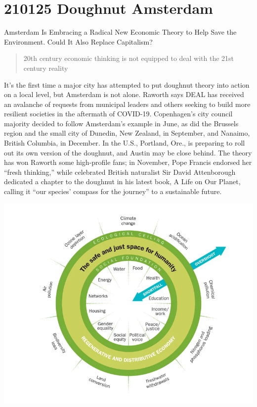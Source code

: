 \documentclass[
]{book}
\begin{document}
\hypertarget{doughnut-amsterdam}{%
\section{210125 Doughnut Amsterdam}\label{doughnut-amsterdam}}

Amsterdam Is Embracing a Radical New Economic Theory to Help Save the Environment.
Could It Also Replace Capitalism?

\begin{quote}
20th century economic thinking is not equipped to deal with the 21st century reality
\end{quote}

It's the first time a major city has attempted to put doughnut theory into action on a local level, but Amsterdam is not alone. Raworth says DEAL has received an avalanche of requests from municipal leaders and others seeking to build more resilient societies in the aftermath of COVID-19. Copenhagen's city council majority decided to follow Amsterdam's example in June, as did the Brussels region and the small city of Dunedin, New Zealand, in September, and Nanaimo, British Columbia, in December. In the U.S., Portland, Ore., is preparing to roll out its own version of the doughnut, and Austin may be close behind. The theory has won Raworth some high-profile fans; in November, Pope Francis endorsed her ``fresh thinking,'' while celebrated British naturalist Sir David Attenborough dedicated a chapter to the doughnut in his latest book, A Life on Our Planet, calling it ``our species' compass for the journey'' to a sustainable future.

\includegraphics{fig/amsterdam-doughnut-economics-3.png}
\end{document}
